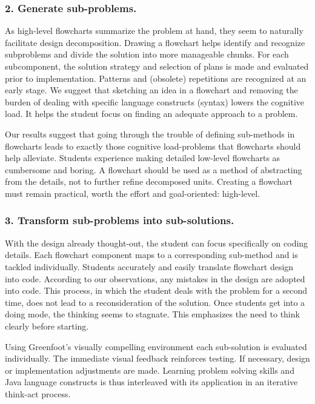 \subsubsection*{2. Generate sub-problems.}
    As high-level flowcharts summarize the problem at hand, they seem to naturally
    facilitate design decomposition. Drawing a flowchart helps identify and recognize subproblems and divide the solution into more manageable chunks. For each subcomponent, the solution strategy and selection of plans is made and evaluated prior to implementation. Patterns and (obsolete) repetitions are recognized at an early stage. We suggest that sketching an idea in a flowchart and removing the burden of dealing with specific language constructs (syntax) lowers the cognitive load. It helps the student focus on finding an adequate approach to a problem.
     

    Our results suggest that going through the trouble of defining sub-methods
    in flowcharts leads to exactly those cognitive load-problems that
    flowcharts should help alleviate. Students experience making detailed
    low-level flowcharts as cumbersome and boring. A flowchart should be used as a method of abstracting from
    the details, not to further refine decomposed units. Creating a flowchart must remain practical, worth the effort and goal-oriented: high-level.


\subsubsection*{3. Transform sub-problems into sub-solutions.}
    With the design already
    thought-out, the student can focus specifically on
    coding details. Each flowchart component maps to a corresponding
    sub-method and is tackled individually. Students accurately and easily translate flowchart design into code.
    According to our observations, any mistakes in the design are adopted
    into code. This process, in which the student deals with the problem for
    a second time, does not lead to a reconsideration of the solution. Once
    students get into a doing mode, the thinking seems to stagnate. This
    emphasizes the need to think clearly before starting.

    Using Greenfoot's visually compelling environment each sub-solution
    is evaluated individually. The immediate visual feedback reinforces testing. If
    necessary, design or implementation adjustments are made. Learning
    problem solving skills and Java language constructs is thus
    interleaved with its application in an iterative think-act process.


